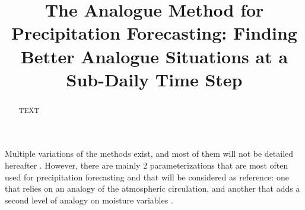 \documentclass[hess]{copernicus}
\begin{document}
\linenumbers

\title{The Analogue Method for Precipitation Forecasting: Finding Better Analogue Situations at a Sub-Daily Time Step}













\received{}
\pubdiscuss{} %
\revised{}
\accepted{}
\published{}




\maketitle



\begin{abstract}
TEXT
\end{abstract}



\introduction  %






Multiple variations of the methods exist, and most of them will not be detailed hereafter \cite[see][for more comprehensive listings]{Horton2016, BenDaoud2015}. However, there are mainly 2 parameterizations that are most often used for precipitation forecasting and that will be considered as reference: one that relies on an analogy of the atmospheric circulation, and another that adds a second level of analogy on moisture variables \citep{Obled2002, Bontron2005, Marty2012}.
\end{document}
